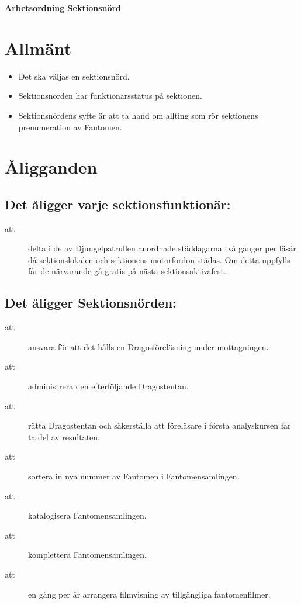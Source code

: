 \renewcommand{\dateseparator}{-} %

\renewcommand{\forening}{Sektionsnörd}

\begin{center}
\LARGE{\textbf{Arbetsordning Sektionsnörd}}
\end{center}


\section{Allmänt}
\begin{itemize}
\item Det ska väljas en sektionsnörd.

\item Sektionsnörden har funktionärsstatus på sektionen.

\item Sektionsnördens syfte är att ta hand om allting som rör sektionens prenumeration av Fantomen.
\end{itemize}


\section{Åligganden}
\subsection{Det åligger varje sektionsfunktionär:}
    \begin{description}
      \item[att] delta i de av Djungelpatrullen anordnade städdagarna två gånger per
      läsår då sektionslokalen och sektionens motorfordon städas. Om detta uppfylls får de närvarande gå gratis på nästa
      sektionsaktivafest.
    \end{description}
\subsection{Det åligger Sektionsnörden:}
    \begin{description}
      \item[att] ansvara för att det hålls en Dragosföreläsning under mottagningen.
      \item[att] administrera den efterföljande Dragostentan.
      \item[att] rätta Dragostentan och säkerställa att föreläsare i första analyskursen får ta del av resultaten.
      \item[att] sortera in nya nummer av Fantomen i Fantomensamlingen.
      \item[att] katalogisera Fantomensamlingen.
      \item[att] komplettera Fantomensamlingen.
      \item[att] en gång per år arrangera filmvisning av tillgängliga fantomenfilmer.
    \end{description}


